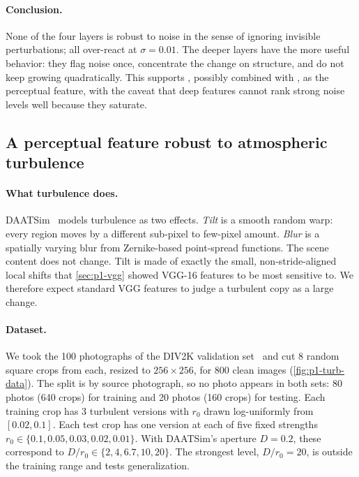 \paragraph{Conclusion.}
None of the four layers is robust to noise in the sense of ignoring invisible perturbations; all over-react at $\sigma=0.01$.
The deeper layers have the more useful behavior: they flag noise once, concentrate the change on structure, and do not keep growing quadratically.
This supports , possibly combined with , as the perceptual feature, with the caveat that deep features cannot rank strong noise levels well because they saturate.

\subsection{A perceptual feature robust to atmospheric turbulence}
\label{sec:p1-turb}

\paragraph{What turbulence does.}
DAATSim~\cite{saha2025daatsim} models turbulence as two effects.
\emph{Tilt} is a smooth random warp: every region moves by a different sub-pixel to few-pixel amount.
\emph{Blur} is a spatially varying blur from Zernike-based point-spread functions.
The scene content does not change.
Tilt is made of exactly the small, non-stride-aligned local shifts that \cref{sec:p1-vgg} showed VGG-16 features to be most sensitive to.
We therefore expect standard VGG features to judge a turbulent copy as a large change.

\paragraph{Dataset.}
We took the 100 photographs of the DIV2K validation set~\cite{agustsson2017div2k} and cut 8 random square crops from each, resized to $256\times256$, for 800 clean images (\cref{fig:p1-turb-data}).
The split is by source photograph, so no photo appears in both sets: 80 photos (640 crops) for training and 20 photos (160 crops) for testing.
Each training crop has 3 turbulent versions with $r_0$ drawn log-uniformly from $[0.02,0.1]$.
Each test crop has one version at each of five fixed strengths $r_0\in\{0.1,0.05,0.03,0.02,0.01\}$.
With DAATSim's aperture $D=0.2$, these correspond to $D/r_0\in\{2,4,6.7,10,20\}$.
The strongest level, $D/r_0=20$, is outside the training range and tests generalization.

